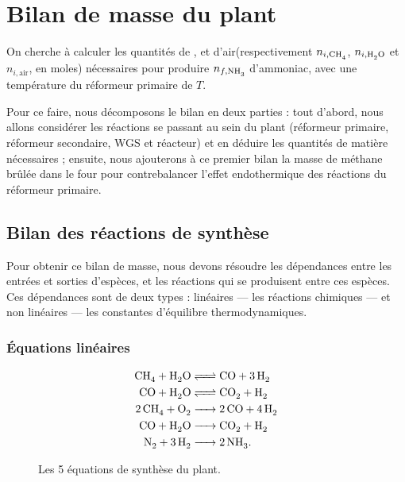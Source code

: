 \section{Bilan de masse du plant}

On cherche à calculer les quantités de ,  et d'air\footnotemark (respectivement $n_{i,\ce{CH4}}$, $n_{i,\ce{H2O}}$ et $n_{i,\text{air}}$, en moles) nécessaires pour produire $n_{f,\ce{NH3}}$\;\mole{} d'ammoniac, avec une température du réformeur primaire de $T$\;\kelvin{}.

Pour ce faire, nous décomposons le bilan en deux parties : tout d'abord, nous allons considérer les réactions se passant au sein du plant (réformeur primaire, réformeur secondaire, WGS et réacteur) et en déduire les quantités de matière nécessaires ; ensuite, nous ajouterons à ce premier bilan la masse de méthane brûlée dans le four pour contrebalancer l'effet endothermique des réactions du réformeur primaire.

\subsection{Bilan des réactions de synthèse}

Pour obtenir ce bilan de masse, nous devons résoudre les dépendances entre les entrées et sorties d'espèces, et les réactions qui se produisent entre ces espèces. Ces dépendances sont de deux types : linéaires --- les réactions chimiques --- et non linéaires --- les constantes d'équilibre thermodynamiques.

\subsubsection{Équations linéaires}

\begin{figure}[h]
    \begingroup
    \addtolength{\jot}{.5em}
    \begin{align}
      \cee{
         CH4 +  H2O &<=>  CO  + 3H2 \\
         CO  +  H2O &<=>  CO2 +  H2 \\
        2CH4 +  O2  &-> 2CO + 4H2 \\
         CO  +  H2O &->  CO2 +  H2\\
         N2  + 3H2  &-> 2NH3
      }
      \text.
    \end{align}
    \endgroup

    \caption{Les 5 équations de synthèse du plant.}
\end{figure}

